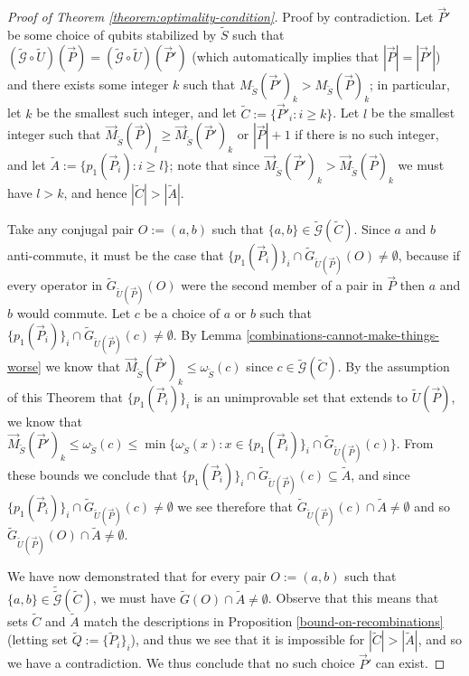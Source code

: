 \documentclass[12pt]{amsbook}
\theoremstyle{plain}
\theoremstyle{definition}
\theoremstyle{remark}
\newcommand{\lst}{\vec}
\newcommand{\set}{\tilde}
\newcommand{\genfun}{\tilde{\mathcal{G}}}
\newcommand{\om}{\omega}
\begin{document}
\begin{proof}[Proof of Theorem \ref{theorem:optimality-condition}]
Proof by contradiction.  Let $\lst P'$ be some choice of qubits stabilized by $\set S$ such that $(\genfun\circ\set U)(\lst P)=(\genfun\circ\set U)(\lst P')$ (which automatically implies that $|\lst P|=|\lst P'|$) and there exists some integer $k$ such that $M_{\set S}(\lst P')_k > M_{\set S}(\lst P)_k$;  in particular, let $k$ be the smallest such integer, and let $\set C:=\{\lst P'_i : i \ge k\}$.  Let $l$ be the smallest integer such that $\lst M_{\set S}(\lst P)_l\ge \lst M_{\set S}(\lst P')_k$ or $|\lst P|+1$ if there is no such integer, and let $\set A := \{p_1(\lst P_i) : i \ge l\}$; note that since $\lst M_{\set S}(\lst P')_k > \lst M_{\set S}(\lst P)_k$ we must have $l>k$, and hence $|\set C| > |\set A|$.

Take any conjugal pair $O:=(a,b)$ such that $\{a,b\}\in\genfun(\set C)$.  Since $a$ and $b$ anti-commute, it must be the case that $\{p_1(\lst P_i)\}_i\cap \set G_{\set U(\lst P)}(O)\ne\emptyset$, because if every operator in $\set G_{\set U(\lst P)}(O)$ were the second member of a pair in $\lst P$ then $a$ and $b$ would commute.  Let $c$ be a choice of $a$ or $b$ such that $\{p_1(\lst P_i)\}_i\cap \set G_{\set U(\lst P)}(c)\ne\emptyset$.  By Lemma \ref{combinations-cannot-make-things-worse} we know that $\lst M_{\set S}(\lst P')_k\le\om_{\set S}(c)$ since $c\in\genfun(\set C)$.  By the assumption of this Theorem that $\{p_1(\lst P_i)\}_i$ is an unimprovable set that extends to $\set U(\lst P)$, we know that $\lst M_{\set S}(\lst P')_k \le \om_{\set S}(c)\le\min \{\om_{\set S}(x):x\in\{p_1(\lst P_i)\}_i\cap \set G_{\set U(\lst P)}(c)\}$.  From these bounds we conclude that $\{p_1(\lst P_i)\}_i\cap \set G_{\set U(\lst P)}(c)\subseteq \set A$, and since $\{p_1(\lst P_i)\}_i\cap \set G_{\set U(\lst P)}(c)\ne\emptyset$ we see therefore that $\set G_{\set U(\lst P)}(c)\cap\set A\ne\emptyset$ and so $\set G_{\set U(\lst P)}(O)\cap\set A\ne\emptyset$.

We have now demonstrated that for every pair $O:=(a,b)$ such that $\{a,b\}\in\set \genfun(\set C)$, we must have $\set G(O)\cap\set A \ne\emptyset$.  Observe that this means that sets $\set C$ and $\set A$ match the descriptions in Proposition \ref{bound-on-recombinations} (letting set $\set Q:=\{\set P_i\}_i$), and thus we see that it is impossible for $|\set C|>|\set A|$, and so we have a contradiction.  We thus conclude that no such choice $\lst P'$ can exist.
\end{proof}
\end{document}
